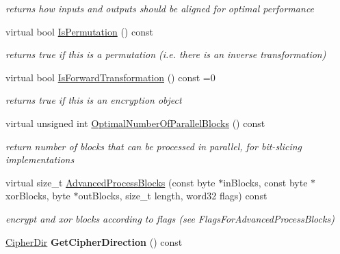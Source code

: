 \begin{DoxyCompactItemize}
\begin{DoxyCompactList}\small\item\em returns how inputs and outputs should be aligned for optimal performance \item\end{DoxyCompactList}\item 
\hypertarget{class_block_transformation_a8d154fdac89307d9edbd2a5ab97fa080}{
virtual bool \hyperlink{class_block_transformation_a8d154fdac89307d9edbd2a5ab97fa080}{IsPermutation} () const }
\label{class_block_transformation_a8d154fdac89307d9edbd2a5ab97fa080}

\begin{DoxyCompactList}\small\item\em returns true if this is a permutation (i.e. there is an inverse transformation) \item\end{DoxyCompactList}\item 
\hypertarget{class_block_transformation_a50f2565057bc9ba7bb70a98d9c9b39cd}{
virtual bool \hyperlink{class_block_transformation_a50f2565057bc9ba7bb70a98d9c9b39cd}{IsForwardTransformation} () const =0}
\label{class_block_transformation_a50f2565057bc9ba7bb70a98d9c9b39cd}

\begin{DoxyCompactList}\small\item\em returns true if this is an encryption object \item\end{DoxyCompactList}\item 
\hypertarget{class_block_transformation_a7aceb4c214d901e9cc416b05d40eb282}{
virtual unsigned int \hyperlink{class_block_transformation_a7aceb4c214d901e9cc416b05d40eb282}{OptimalNumberOfParallelBlocks} () const }
\label{class_block_transformation_a7aceb4c214d901e9cc416b05d40eb282}

\begin{DoxyCompactList}\small\item\em return number of blocks that can be processed in parallel, for bit-\/slicing implementations \item\end{DoxyCompactList}\item 
virtual size\_\-t \hyperlink{class_block_transformation_a91a57e51748a6b91a18d8608b47ea896}{AdvancedProcessBlocks} (const byte $\ast$inBlocks, const byte $\ast$xorBlocks, byte $\ast$outBlocks, size\_\-t length, word32 flags) const 
\begin{DoxyCompactList}\small\item\em encrypt and xor blocks according to flags (see FlagsForAdvancedProcessBlocks) \item\end{DoxyCompactList}\item 
\hypertarget{class_block_transformation_abf4c2e7cf9a5c3bb1729e9d1126f0d7c}{
\hyperlink{cryptlib_8h_a353ccabf5ddc119a6a33e92f7b9961c7}{CipherDir} {\bfseries GetCipherDirection} () const }
\label{class_block_transformation_abf4c2e7cf9a5c3bb1729e9d1126f0d7c}

\end{DoxyCompactItemize}
